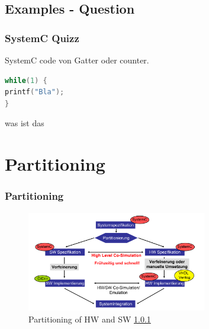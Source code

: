 \documentclass{beamer}
\begin{document}
\subsection{Examples - Question}
\begin{frame}[fragile]\frametitle{SystemC Quizz} 
SystemC code von Gatter oder counter.
\begin{lstlisting}[language=C++, basicstyle=\footnotesize]
while(1) {
printf("Bla");
}
\end{lstlisting}
was ist das
\end{frame}

\section{Partitioning}
\begin{frame}\frametitle{Partitioning} 
	    \begin{figure}[hp]
	      \centering
	      \includegraphics[width=0.7\textwidth]{pictures/design_flow.pdf}
	      \caption{Partitioning of HW and SW \ref{}}
	      \label{fig:flow}
	    \end{figure} 



\end{frame}
\end{document}
